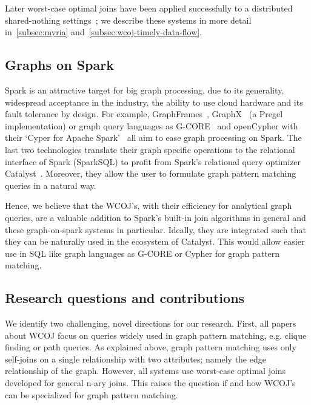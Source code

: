 Later worst-case optimal joins have been applied successfully to a distributed shared-nothing settings~\cite{myria-detailed,
ammar2018distributed};
we describe these systems in more detail in~\cref{subsec:myria} and~\ref{subsec:wcoj-timely-data-flow}.

\subsection{Graphs on Spark}\label{subsec:graphs-on-spark}
Spark is an attractive target for big graph processing, due to its generality, widespread acceptance in the industry, the ability to use
cloud hardware and its fault tolerance by design.
For example, GraphFrames~\cite{graphframe}, GraphX~\cite{graphx} (a Pregel~\cite{pregel} implementation) or graph query languages
as \mbox{G-CORE}~\cite{gcore} and \mbox{openCypher} with their `Cyper for Apache Spark'~\cite{caps} all aim to ease graph processing on
Spark.
The last two technologies translate their graph specific operations to the relational interface of Spark (SparkSQL)
to profit from Spark's relational query optimizer Catalyst~\cite{spark-sql}.
Moreover, they allow the user to formulate graph pattern matching queries in a natural way.

Hence, we believe that the WCOJ's, with their efficiency for analytical graph queries, are a valuable addition to Spark's
built-in join algorithms in general and these graph-on-spark systems in particular.
Ideally, they are integrated such that they can be naturally used in the ecosystem of Catalyst.
This would allow easier use in SQL like graph languages as \textsc{G-CORE} or Cypher for graph pattern matching.

\subsection{Research questions and contributions}\label{subsec:research-questions-and-contributions}
We identify two challenging, novel directions for our research.
First, all papers about \textsc{WCOJ} focus on queries widely used in graph pattern matching, e.g. clique finding or path queries.
As explained above, graph pattern matching uses only self-joins on a single relationship with two attributes;
namely the edge relationship of the graph.
However, all systems use worst-case optimal joins developed for general n-ary joins.
This raises the question if and how \textsc{WCOJ}'s can be specialized for graph pattern matching.

